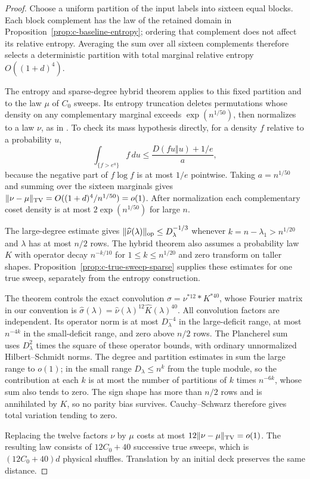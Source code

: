 \begin{proof}
Choose a uniform partition of the input labels into sixteen equal
blocks.  Each block complement has the law of the retained domain in
Proposition~\ref{prop:c-baseline-entropy}; ordering that complement
does not affect its relative entropy.  Averaging the sum over all
sixteen complements therefore selects a deterministic partition with
total marginal relative entropy $O((1+d)^4)$.

The entropy and sparse-degree hybrid theorem
\cite[Theorem~\ref*{l-l:forest-hybrid}]{partialFourier}
applies to this fixed partition and to the
law $\mu$ of $C_0$ sweeps.  Its entropy truncation deletes permutations
whose density on any complementary marginal exceeds
$\exp(n^{1/50})$, then normalizes to a law $\nu$, as in
\cite[Lemma~\ref*{l-l:forest-clipping}]{partialFourier}.  To check its mass
hypothesis directly, for a density $f$ relative to a probability $u$,
\[
 \int_{\{f>e^a\}}f\,du
 \le\frac{D(fu\Vert u)+1/e}{a},
\]
because the negative part of $f\log f$ is at most $1/e$ pointwise.
Taking $a=n^{1/50}$ and summing over the sixteen marginals gives
$\|\nu-\mu\|_{\rm TV}=O((1+d)^4/n^{1/50})=o(1)$.
After normalization each complementary coset density is at most
$2\exp(n^{1/50})$ for large $n$.

The large-degree estimate
\cite[Proposition~\ref*{l-l:forest-bulk}]{partialFourier} gives
$\|\widehat\nu(\lambda)\|_{\rm op}\le D_\lambda^{-1/3}$ whenever
$k=n-\lambda_1>n^{1/20}$ and $\lambda$ has at most $n/2$ rows.
The hybrid theorem
\cite[Theorem~\ref*{l-l:forest-hybrid}]{partialFourier} also assumes a
probability law $K$ with operator decay $n^{-k/10}$ for
$1\le k\le n^{1/20}$ and zero transform on taller shapes.
Proposition~\ref{prop:c-true-sweep-sparse} supplies these estimates for
one true sweep, separately from the entropy construction.

The theorem controls the exact convolution
$\sigma=\nu^{*12}*K^{*40}$, whose Fourier matrix in our convention is
$\widehat\sigma(\lambda)=\widehat\nu(\lambda)^{12}
\widehat K(\lambda)^{40}$. All convolution factors are independent.
Its operator norm is at most $D_\lambda^{-4}$ in the large-deficit
range, at most $n^{-4k}$ in the small-deficit range, and zero above
$n/2$ rows.  The Plancherel sum uses
$D_\lambda^2$ times the square of these operator bounds, with ordinary
unnormalized Hilbert--Schmidt norms.  The degree and partition estimates
in \cite[Theorem~\ref*{l-l:forest-hybrid}]{partialFourier}
sum the large range to $o(1)$; in the small range
$D_\lambda\le n^k$ from the tuple module, so the contribution at each
$k$ is at most the number of partitions of $k$ times $n^{-6k}$, whose
sum also tends to zero.  The sign shape has more than $n/2$ rows and
is annihilated by $K$, so no parity bias survives.  Cauchy--Schwarz
therefore gives total variation tending to zero.

Replacing the twelve factors $\nu$ by $\mu$ costs at most
$12\|\nu-\mu\|_{\rm TV}=o(1)$.  The resulting law consists of
$12C_0+40$ successive true sweeps, which is $(12C_0+40)d$ physical
shuffles.  Translation by an initial deck preserves the same distance.
\end{proof}

